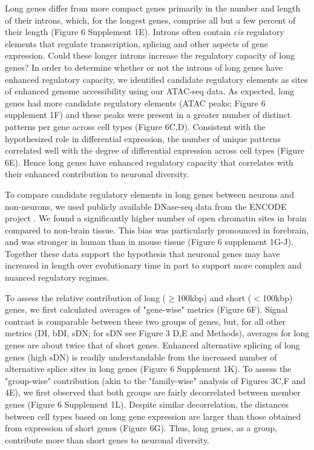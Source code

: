Long genes differ from more compact genes primarily in the number and length of their introns, which, for the longest genes, comprise all but a few percent of their length (Figure 6 Supplement 1E). Introns often contain \textit{cis} regulatory elements that regulate transcription, splicing and other aspects of gene expression. Could these longer introns increase the regulatory capacity of long genes? In order to determine whether or not the introns of long genes have enhanced regulatory capacity, we identified candidate regulatory elements as sites of enhanced genome accessibility using our ATAC-seq data. As expected, long genes had more candidate regulatory elements (ATAC peaks; Figure 6 supplement 1F) and these peaks were present in a greater number of distinct patterns per gene across cell types (Figure 6C,D). Consistent with the hypothesized role in differential expression, the number of unique patterns correlated well with the degree of differential expression across cell types (Figure 6E). Hence long genes have enhanced regulatory capacity that correlates with their enhanced contribution to neuronal diversity.

To compare candidate regulatory elements in long genes between neurons and non-neurons, we used publicly available DNase-seq data from the ENCODE project \citep{Dunham_2012}. We found a significantly higher number of open chromatin sites in brain compared to non-brain tissue. This bias was particularly pronounced in forebrain, and was stronger in human than in mouse tissue (Figure 6 supplement 1G-J). Together these data support the hypothesis that neuronal genes may have increased in length over evolutionary time in part to support more complex and nuanced regulatory regimes. 

To assess the relative contribution of long ($\geq$100kbp) and short ($<$100kbp) genes, we first calculated averages of "gene-wise" metrics (Figure 6F). Signal contrast is comparable between these two groups of genes, but, for all other metrics (DI, bDI, sDN; for sDN see Figure 3 D,E and Methods), averages for long genes are about twice that of short genes. Enhanced alternative splicing of long genes (high sDN) is readily understandable from the increased number of alternative splice sites in long genes (Figure 6 Supplement 1K). To assess the "group-wise" contribution (akin to the "family-wise" analysis of Figures 3C,F and 4E), we first observed that both groups are fairly decorrelated between member genes (Figure 6 Supplement 1L). Despite similar decorrelation, the distances between cell types based on long gene expression are larger than those obtained from expression of short genes (Figure 6G). Thus, long genes, as a group, contribute more than short genes to neuronal diversity. 








